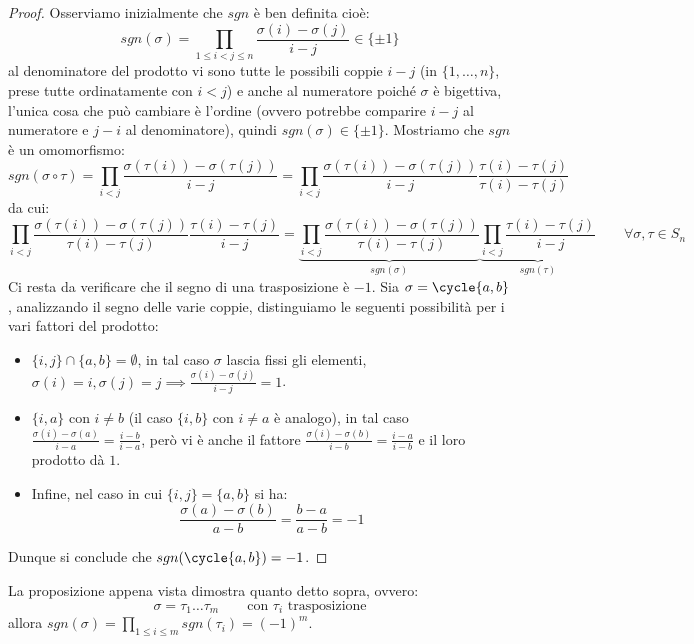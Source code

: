 \documentclass[11pt]{scrartcl}
\begin{document}
\begin{proof}
    Osserviamo inizialmente che $sgn$ è ben definita cioè:
        \[ sgn(\sigma) = \prod_{1 \leq i < j \leq n} \frac{\sigma(i) - \sigma(j)}{i - j} \in \{\pm 1\}
            \]
    al denominatore del prodotto vi sono tutte le possibili coppie $i - j$ (in $\{1,\ldots,n\}$, prese tutte ordinatamente con $i<j$) e anche al numeratore poiché $\sigma$ è bigettiva, l'unica cosa che 
    può cambiare è l'ordine (ovvero potrebbe comparire $i - j$ al numeratore e $j - i$ al denominatore), quindi $sgn(\sigma) \in \{\pm 1\}$. Mostriamo che $sgn$ 
    è un omomorfismo:
        \[ sgn(\sigma \circ \tau) = \prod_{i < j}\frac{\sigma(\tau(i)) - \sigma(\tau(j))}{i - j} =  \prod_{i < j}\frac{\sigma(\tau(i)) - \sigma(\tau(j))}{i - j}\frac{\tau(i) - \tau(j)}{\tau(i) - \tau(j)}
            \]
    da cui:
        \[ \prod_{i < j}\frac{\sigma(\tau(i)) - \sigma(\tau(j))}{\tau(i) - \tau(j)}\frac{\tau(i) - \tau(j)}{ i - j} =
        \underbrace{\prod_{i < j} \frac{\sigma(\tau(i)) - \sigma(\tau(j))}{\tau(i) - \tau(j)}}_{sgn(\sigma)} \underbrace{\prod_{i < j}\frac{\tau(i) - \tau(j)}{ i - j}}_{sgn(\tau)}
        \qquad \forall \sigma,\tau \in S_n
            \]
    Ci resta da verificare che il segno di una trasposizione è $-1$. Sia $\sigma = \cycle{a,b}$, analizzando il segno delle varie coppie, distinguiamo le seguenti possibilità per i vari fattori del prodotto:
    \begin{itemize}
        \item $\{i,j\} \cap \{a,b\} = \emptyset $, in tal caso $\sigma$ lascia fissi gli elementi, $\sigma(i) = i, \sigma(j) = j \implies \frac{\sigma(i) - \sigma(j)}{i - j} = 1$.
        \item $\{i,a\}$ con $i \ne b$ (il caso $\{i,b\}$ con $i \ne a$ è analogo), in tal caso $\frac{\sigma(i) - \sigma(a)}{i - a} = \frac{i - b}{i - a}$, però vi è anche il fattore $\frac{\sigma(i) - \sigma(b)}{i - b} = \frac{i - a}{i - b}$ e 
            il loro prodotto dà $1$.
        \item Infine, nel caso in cui $\{i,j\} = \{a,b\}$ si ha:
            \[ \frac{\sigma(a) - \sigma(b)}{a - b} = \frac{b - a}{a - b} = -1
                \]
    \end{itemize}
    Dunque si conclude che $sgn(\cycle{a,b}) = -1$.
\end{proof}

\begin{remark}
    La proposizione appena vista dimostra quanto detto sopra, ovvero:
        \[ \sigma = \tau_1 \ldots \tau_m \qquad \text{con $\tau_i$ trasposizione}
            \]
    allora $sgn(\sigma) = \prod_{1\leq i \leq m}sgn(\tau_i) = (-1)^m$.
\end{remark}
\end{document}
